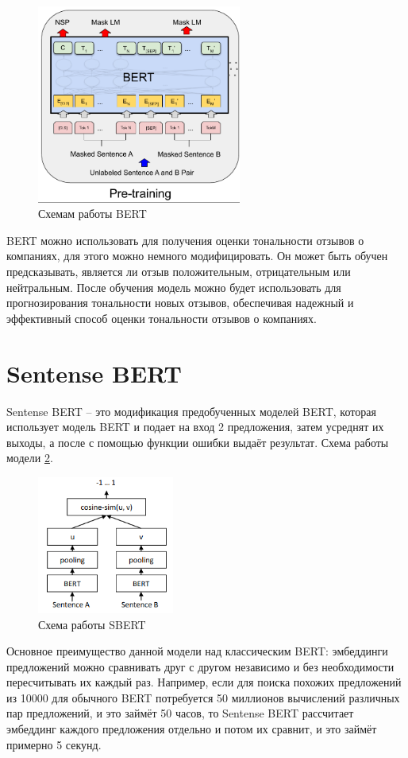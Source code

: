\documentclass[PI, VKR]{HSEUniversity}
\begin{document}
\begin{enumerate}
\begin{figure}[!hbp]
\centering
\includegraphics[width=0.6\textwidth]{img/bert_pretrainin.png}
\caption{\label{fig:bert_pretraining}Схемам работы BERT}
\end{figure}
\end{enumerate}

BERT можно использовать для получения оценки тональности отзывов о компаниях, для этого можно немного модифицировать. Он может быть обучен предсказывать, является ли отзыв положительным, отрицательным или нейтральным. После обучения модель можно будет использовать для прогнозирования тональности новых отзывов, обеспечивая надежный и эффективный способ оценки тональности отзывов о компаниях.
\section{Sentense BERT}
\label{sec:orgf91b8f1}
Sentense BERT \autocite{reimers-2019-sentence-bert} -- это модификация предобученных моделей BERT, которая использует модель BERT и подает на вход 2 предложения, затем усреднят их выходы, а после с помощью функции ошибки выдаёт результат. Схема работы модели \ref{fig:sbert}.
\begin{figure}[hbp]
\centering
\includegraphics[width=0.4\textwidth]{img/sbert.png}
\caption{\label{fig:sbert}Схема работы SBERT}
\end{figure}
Основное преимущество данной модели над классическим BERT: эмбеддинги предложений можно сравнивать друг с другом независимо и без необходимости пересчитывать их каждый раз. Например, если для поиска похожих предложений из 10000 для обычного BERT потребуется 50 миллионов вычислений различных пар предложений, и это займёт 50 часов, то Sentense BERT рассчитает эмбеддинг каждого предложения отдельно и потом их сравнит, и это займёт примерно 5 секунд.
\end{document}
